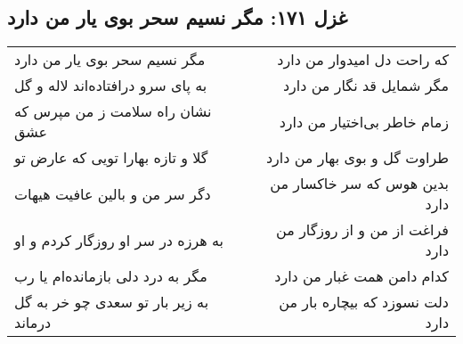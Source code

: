 \begin{center}
\section*{غزل ۱۷۱: مگر نسیم سحر بوی یار من دارد}
\label{sec:171}
\begin{longtable}{l p{0.5cm} r}
مگر نسیم سحر بوی یار من دارد
&&
که راحت دل امیدوار من دارد
\\
به پای سرو درافتاده‌اند لاله و گل
&&
مگر شمایل قد نگار من دارد
\\
نشان راه سلامت ز من مپرس که عشق
&&
زمام خاطر بی‌اختیار من دارد
\\
گلا و تازه بهارا تویی که عارض تو
&&
طراوت گل و بوی بهار من دارد
\\
دگر سر من و بالین عافیت هیهات
&&
بدین هوس که سر خاکسار من دارد
\\
به هرزه در سر او روزگار کردم و او
&&
فراغت از من و از روزگار من دارد
\\
مگر به درد دلی بازمانده‌ام یا رب
&&
کدام دامن همت غبار من دارد
\\
به زیر بار تو سعدی چو خر به گل درماند
&&
دلت نسوزد که بیچاره بار من دارد
\\
\end{longtable}
\end{center}
